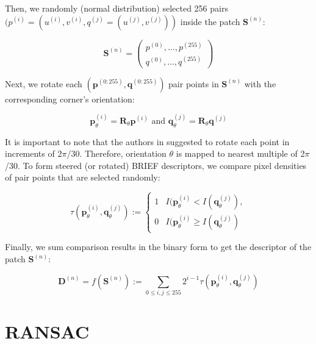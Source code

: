 \documentclass[12pt]{report}
\numberwithin{figure}{section}
\begin{document}
\begin{appendices}
\begin{enumerate}
	
	Then, we randomly (normal distribution) selected 256 pairs 
	$(p^{(i)}=(u^{(i)},v^{(i)},q^{(j)}=(u^{(j)},v^{(j)}))$ inside the patch 
	$\mathbf{S}^{(n)}$:
	
	\begin{equation}
	\mathbf{S}^{(n)} = 
	\begin{pmatrix}
	p^{(0)}, \dots, p^{(255)}\\
	q^{(0)}, \dots, q^{(255)}
	\end{pmatrix}
	\end{equation}
	
	Next, we rotate each $(\mathbf{p}^{(0:255)}, \mathbf{q}^{(0:255)})$ pair 
	points in $\mathbf{S}^{(n)}$ with the corresponding corner's orientation:
	
	\begin{equation}
	\mathbf{p}^{(i)}_{\theta} = \mathbf{R}_{\theta}\mathbf{p}^{(i)} \text{ and 
	} 
	\mathbf{q}^{(j)}_{\theta} = \mathbf{R}_{\theta}\mathbf{q}^{(j)}
	\end{equation}
	
	It is important to note that the authors in \parencite{Rublee2011a} 
	suggested 
	to rotate each point in increments of 2$\pi$/30. Therefore, orientation 
	$\theta$ is mapped to nearest multiple of 2$\pi$/30. To form steered (or 
	rotated) BRIEF descriptors, we compare pixel densities of pair points that 
	are selected randomly:
	
	\begin{equation*}
	\tau(\mathbf{p}^{(i)}_{\theta},\mathbf{q}^{(j)}_{\theta}) := 
	\begin{cases}
	1  & I(\mathbf{p}^{(i)}_{\theta} < I(\mathbf{q}^{(j)}_{\theta}),\\
	0  & I(\mathbf{p}^{(i)}_{\theta} \geq I(\mathbf{q}^{(j)}_{\theta})
	\end{cases}
	\end{equation*}
	
	Finally, we sum comparison results in the binary form to get the 
	descriptor  
	of the patch $\mathbf{S}^{(n)}$:
	
	\begin{equation}
	\mathbf{D}^{(n)} = f(\mathbf{S}^{(n)}) := \sum_{0\leq i,j \leq 255} 
	2^{i-1}\tau (\mathbf{p}^{(i)}_{\theta},\mathbf{q}^{(j)}_{\theta})
	\end{equation}
	
\end{enumerate}


\section{RANSAC} \label{sb_sc_ransac_app}


\end{appendices}
\end{document}
